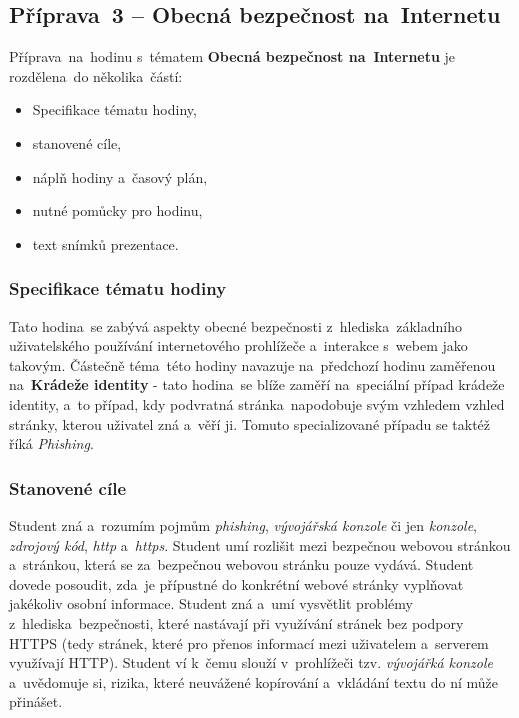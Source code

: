 \documentclass[a4paper, 12pt]{article}
\begin{document}
\subsection{Příprava~3 -- Obecná bezpečnost na~Internetu}
Příprava~na~hodinu s~tématem \textbf{Obecná bezpečnost na~Internetu} je rozdělena~do několika~částí:
\begin{itemize}
        \setlength{\itemsep}{-3pt}
        \item Specifikace tématu hodiny,
        \item stanovené cíle,
        \item náplň hodiny a~časový plán,
        \item nutné pomůcky pro hodinu,
        \item text snímků prezentace.
\end{itemize}

\subsubsection{Specifikace tématu hodiny}
Tato hodina~se zabývá aspekty obecné bezpečnosti z~hlediska~základního uživatelského používání internetového prohlížeče a~interakce s~webem jako takovým. Částečně téma~této hodiny navazuje na~předchozí hodinu zaměřenou na~\textbf{Krádeže identity} - tato hodina~se blíže zaměří na~speciální případ krádeže identity, a~to případ, kdy podvratná stránka~napodobuje svým vzhledem vzhled stránky, kterou uživatel zná a~věří ji. Tomuto specializované případu se taktéž říká \textit{Phishing}.

\subsubsection{Stanovené cíle}
Student zná a~rozumím pojmům \textit{phishing}, \textit{vývojářská konzole} či jen \textit{konzole}, \textit{zdrojový kód}, \textit{http} a~\textit{https}. Student umí rozlišit mezi bezpečnou webovou stránkou a~stránkou, která se za~bezpečnou webovou stránku pouze vydává. Student dovede posoudit, zda~je přípustné do konkrétní webové stránky vyplňovat jakékoliv osobní informace. Student zná a~umí vysvětlit problémy z~hlediska~bezpečnosti, které nastávají při využívání stránek bez podpory HTTPS (tedy stránek, které pro přenos informací mezi uživatelem a~serverem využívají HTTP). Student ví k~čemu slouží v~prohlížeči tzv. \textit{vývojářká konzole} a~uvědomuje si, rizika, které neuvážené kopírování a~vkládání textu do ní může přinášet.
\end{document}
